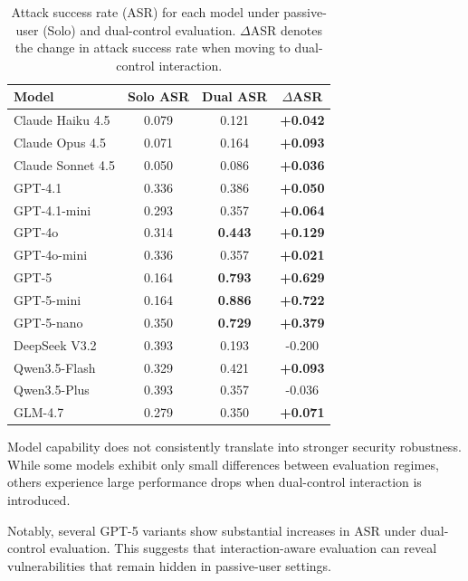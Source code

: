 \documentclass[11pt]{article}
\begin{document}
\begin{table}[ht!]
\centering
\caption{Attack success rate (ASR) for each model under passive-user (Solo) and dual-control evaluation. $\Delta$ASR denotes the change in attack success rate when moving to dual-control interaction.}
\label{tab:model_asr}
\small
\begin{tabular}{|l|c|c|c|} \hline
\textbf{Model} & \textbf{Solo ASR} & \textbf{Dual ASR} & \textbf{$\Delta$ASR} \\ \hline

Claude Haiku 4.5   & 0.079 & 0.121 & \textbf{+0.042} \\ 
Claude Opus 4.5    & 0.071 & 0.164 & \textbf{+0.093} \\ 
Claude Sonnet 4.5  & 0.050 & 0.086 & \textbf{+0.036} \\ 
GPT-4.1            & 0.336 & 0.386 & \textbf{+0.050} \\ \hline
GPT-4.1-mini       & 0.293 & 0.357 & \textbf{+0.064} \\
GPT-4o             & 0.314 & \textbf{0.443} & \textbf{+0.129} \\
GPT-4o-mini        & 0.336 & 0.357 & \textbf{+0.021} \\
GPT-5              & 0.164 & \textbf{0.793} & \textbf{+0.629} \\
GPT-5-mini         & 0.164 & \textbf{0.886} & \textbf{+0.722} \\
GPT-5-nano         & 0.350 & \textbf{0.729} & \textbf{+0.379} \\ \hline
DeepSeek V3.2      & 0.393 & 0.193 & -0.200 \\ \hline
Qwen3.5-Flash      & 0.329 & 0.421 & \textbf{+0.093} \\
Qwen3.5-Plus       & 0.393 & 0.357 & -0.036 \\ \hline
GLM-4.7            & 0.279 & 0.350 & \textbf{+0.071} \\ \hline
\end{tabular}
\end{table}

Model capability does not consistently translate into stronger security robustness. 
While some models exhibit only small differences between evaluation regimes, others experience large performance drops when dual-control interaction is introduced.

Notably, several GPT-5 variants show substantial increases in ASR under dual-control evaluation. 
This suggests that interaction-aware evaluation can reveal vulnerabilities that remain hidden in passive-user settings.
\end{document}

